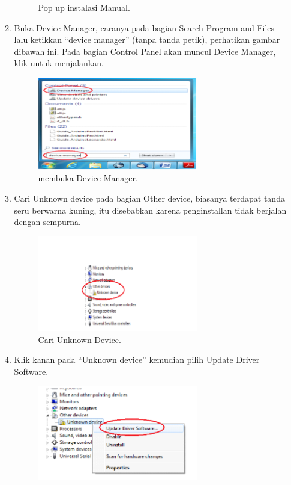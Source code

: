 \begin{enumerate}
\begin{enumerate}
\begin{figure}[ht]
				\centering
				\caption{Pop up instalasi Manual.}
		\end{figure}
		\item Buka Device Manager, caranya pada bagian Search Program and Files lalu ketikkan “device manager” (tanpa tanda petik), perhatikan gambar dibawah ini. Pada bagian Control Panel akan muncul Device Manager, klik untuk menjalankan.
		\begin{figure}[ht]
				\includegraphics[width=7cm]{figures/5/1174087/Teori/4.png}
				\centering
				\caption{membuka Device Manager.}
		\end{figure}
	\item Cari Unknown device pada bagian Other device, biasanya terdapat tanda seru berwarna kuning, itu disebabkan karena penginstallan tidak berjalan dengan sempurna.
		\begin{figure}[ht]
				\includegraphics[width=7cm]{figures/5/1174087/Teori/5.png}
				\centering
				\caption{Cari Unknown Device.}
		\end{figure}
		\item Klik kanan pada “Unknown device” kemudian pilih Update Driver Software.
		\begin{figure}[ht]
				\includegraphics[width=7cm]{figures/5/1174087/Teori/6.png}
				\centering

\end{figure}
\end{enumerate}
\end{enumerate}
